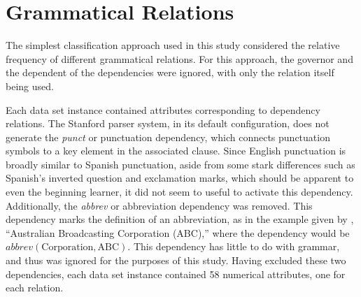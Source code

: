 \documentclass[main.tex]{subfiles}
\begin{document}
\section{Grammatical Relations}

The simplest classification approach used in this study considered the relative frequency of different grammatical relations. For this approach, the governor and the dependent of the dependencies were ignored, with only the relation itself being used. 

Each data set instance contained attributes corresponding to dependency relations. The Stanford parser system, in its default configuration, does not generate the \textit{punct} or punctuation dependency, which connects punctuation symbols to a key element in the associated clause. Since English punctuation is broadly similar to Spanish punctuation, aside from some stark differences such as Spanish's inverted question and exclamation marks, which should be apparent to even the beginning learner, it did not seem to useful to activate this dependency. Additionally, the \textit{abbrev} or abbreviation dependency was removed. This dependency marks the definition of an abbreviation, as in the example given by \citet{typed-deps-manual}, ``Australian Broadcasting Corporation (ABC),'' where the dependency would be $abbrev(\text{Corporation},\text{ABC})$. This dependency has little to do with grammar, and thus was ignored for the purposes of this study. Having excluded these two dependencies, each data set instance contained 58 numerical attributes, one for each relation.
\end{document}
